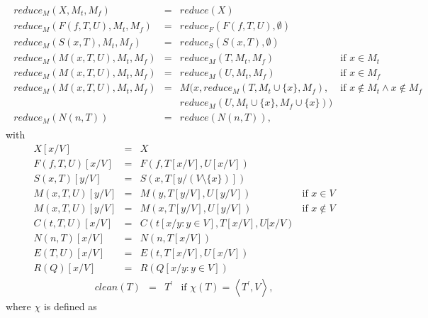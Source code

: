 \documentclass{article}
\begin{document}
\begin{equation*}
\begin{array}{l}
\begin{array}{llll}
reduce_{M}(X,M_{t},M_{f}) & = & reduce(X) &  \\ 
reduce_{M}(F(f,T,U),M_{t},M_{f}) & = & reduce_{F}(F(f,T,U),\emptyset ) &  \\ 
reduce_{M}(S(x,T),M_{t},M_{f}) & = & reduce_{S}(S(x,T),\emptyset ) &  \\ 
reduce_{M}(M(x,T,U),M_{t},M_{f}) & = & reduce_{M}(T,M_{t},M_{f}) & \text{if }%
x\in M_{t} \\ 
reduce_{M}(M(x,T,U),M_{t},M_{f}) & = & reduce_{M}(U,M_{t},M_{f}) & \text{if }%
x\in M_{f} \\ 
reduce_{M}(M(x,T,U),M_{t},M_{f}) & = & M(x,reduce_{M}(T,M_{t}\cup
\{x\},M_{f}), & \text{if }x\notin M_{t}\wedge x\notin M_{f} \\ 
&  & reduce_{M}(U,M_{t}\cup \{x\},M_{f}\cup \{x\})) &  \\ 
reduce_{M}(N(n,T)) & = & reduce(N(n,T)), & 
\end{array}%
\end{array}%
\end{equation*}%
with%
\begin{equation*}
\begin{array}{llll}
X[x/V] & = & X &  \\ 
F(f,T,U)[x/V] & = & F(f,T[x/V],U[x/V]) &  \\ 
S(x,T)[y/V] & = & S(x,T[y/(V\setminus \{x\})]) &  \\ 
M(x,T,U)[y/V] & = & M(y,T[y/V],U[y/V]) & \text{if }x\in V \\ 
M(x,T,U)[y/V] & = & M(x,T[y/V],U[y/V]) & \text{if }x\notin V \\ 
C(t,T,U)[x/V] & = & C(t[x/y:y\in V],T[x/V],U[x/V) &  \\ 
N(n,T)[x/V] & = & N(n,T[x/V]) &  \\ 
E(T,U)[x/V] & = & E(t,T[x/V],U[x/V]) &  \\ 
R(Q)[x/V] & = & R(Q[x/y:y\in V]) & 
\end{array}%
\end{equation*}%
\begin{equation*}
\begin{array}{llll}
clean(T) & = & T^{\prime } & \text{if }\chi (T)=\left\langle T^{\prime
},V\right\rangle ,%
\end{array}%
\end{equation*}%
where $\chi $ is defined as%
\end{document}
